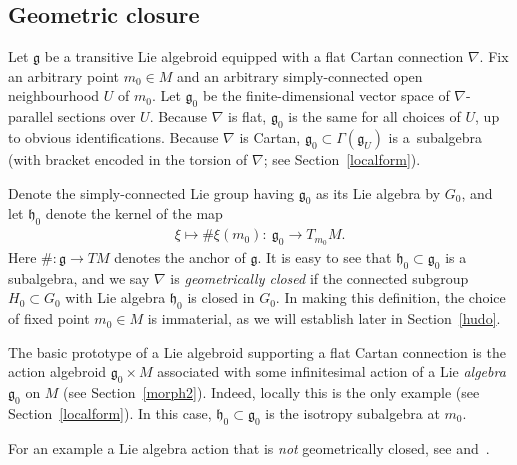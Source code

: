 \subsection{Geometric closure}\label{geomclose}

Let ${\mathfrak g} $ be a transitive Lie algebroid equipped with a
f\/lat Cartan connection $\nabla$. Fix an arbitrary point $m_0 \in M$
and an arbitrary simply-connected open neighbourhood $U$ of $m_0$. Let
${\mathfrak g}_0$ be the f\/inite-dimensional vector space of $\nabla
$-parallel sections over $U$. Because $\nabla$ is f\/lat, ${\mathfrak
  g}_0$ is the same for all choices of $U$, up to obvious
identif\/ications. Because $\nabla$ is Cartan, ${\mathfrak g}_0 \subset
\Gamma({\mathfrak g}_U)$ is a~subalgebra (with bracket encoded in the
torsion of $\nabla $; see Section~\ref{localform}).

Denote the simply-connected Lie group having ${\mathfrak g}_0 $ as its
Lie algebra by $G_0$, and let ${\mathfrak h}_0$ denote the kernel of
the map
\begin{gather*}
  \xi \mapsto \#\xi (m_0) \colon \  {\mathfrak g}_0 \rightarrow
  T_{m_0}M.
\end{gather*}
Here $\# \colon {\mathfrak g} \rightarrow TM$ denotes the anchor of
$\mathfrak g$. It is easy to see that ${\mathfrak h}_0 \subset
{\mathfrak g}_0$ is a subalgebra, and we say $\nabla $ is {\it
  geometrically closed} if the connected subgroup $H_0 \subset G_0$
with Lie algebra ${\mathfrak h}_0$ is closed in $G_0$. In making this
def\/inition, the choice of f\/ixed point $m_0 \in M$ is immaterial, as we
will establish later in Section~\ref{hudo}.

The basic prototype of a Lie algebroid supporting a f\/lat Cartan
connection is the action algebroid ${\mathfrak g}_0 \times M$
associated with some inf\/initesimal action of a Lie {\em algebra}
${\mathfrak g}_0$ on $M$ (see Section~\ref{morph2}). Indeed, locally this is
the only example (see Section~\ref{localform}). In this case, ${\mathfrak
  h}_0 \subset {\mathfrak g}_0$ is the isotropy subalgebra at $m_0$.

For an example a Lie algebra action that is {\em not} geometrically
closed, see \cite[Example~8]{Kamber_Michor_04} and~\cite{Kowalski_97}.


